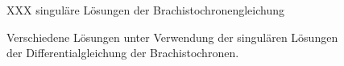 %
%
%
\begin{figure}
\centering
\vspace*{2cm}
XXX singuläre Lösungen der Brachistochronengleichung
\vspace*{2cm}
\caption{Verschiedene Lösungen unter Verwendung der singulären Lösungen
der Differentialgleichung der Brachistochronen.
\label{buch:variation:eulerlagrange:fig:brachloes}}
\end{figure}
